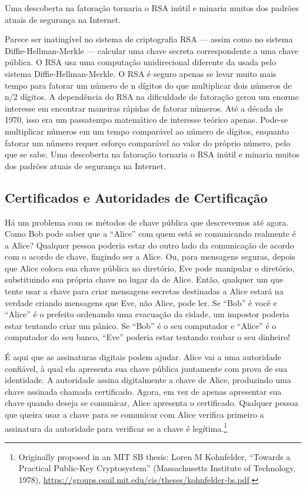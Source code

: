 \documentclass{book}
\begin{document}
Uma descoberta na fatoração tornaria o RSA inútil e minaria muitos dos padrões atuais de segurança na Internet.

Parece ser inatingível no sistema de criptografia RSA --- assim como no sistema Diffie-Hellman-Merkle --- calcular uma chave secreta correspondente a uma chave pública. O RSA usa uma computação unidirecional diferente da usada pelo sistema Diffie-Hellman-Merkle. O RSA é seguro apenas se levar muito mais tempo para fatorar um número de n dígitos do que multiplicar dois números de n/2 dígitos. A dependência do RSA na dificuldade de fatoração gerou um enorme interesse em encontrar maneiras rápidas de fatorar números. Até a década de 1970, isso era um passatempo matemático de interesse teórico apenas. Pode-se multiplicar números em um tempo comparável ao número de dígitos, enquanto fatorar um número requer esforço comparável ao valor do próprio número, pelo que se sabe. Uma descoberta na fatoração tornaria o RSA inútil e minaria muitos dos padrões atuais de segurança na Internet.


\subsection{Certificados e Autoridades de Certificação}
\label{segredos:certificados-aut-cert}

Há um problema com os métodos de chave pública que descrevemos até agora. Como Bob pode saber que a ``Alice'' com quem está se comunicando realmente é a Alice? Qualquer pessoa poderia estar do outro lado da comunicação de acordo com o acordo de chave, fingindo ser a Alice. Ou, para mensagens seguras, depois que Alice coloca sua chave pública no diretório, Eve pode manipular o diretório, substituindo sua própria chave no lugar da de Alice. Então, qualquer um que tente usar a chave para criar mensagens secretas destinadas a Alice estará na verdade criando mensagens que Eve, não Alice, pode ler. Se ``Bob'' é você e ``Alice'' é o prefeito ordenando uma evacuação da cidade, um impostor poderia estar tentando criar um pânico. Se ``Bob'' é o seu computador e ``Alice'' é o computador do seu banco, ``Eve'' poderia estar tentando roubar o seu dinheiro!

É aqui que as assinaturas digitais podem ajudar. Alice vai a uma autoridade confiável, à qual ela apresenta sua chave pública juntamente com prova de sua identidade. A autoridade assina digitalmente a chave de Alice, produzindo uma chave assinada chamada certificado. Agora, em vez de apenas apresentar sua chave quando deseja se comunicar, Alice apresenta o certificado. Qualquer pessoa que queira usar a chave para se comunicar com Alice verifica primeiro a assinatura da autoridade para verificar se a chave é legítima.\footnote{Originally proposed in an MIT SB thesis: Loren M Kohnfelder, “Towards a Practical Public‐Key Cryptosystem” (Massachusetts Institute of Technology, 1978), \url{https://groups.csail.mit.edu/cis/theses/kohnfelder‐bs.pdf}.}
\end{document}
